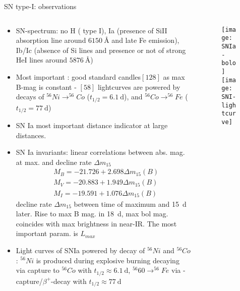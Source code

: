 \begin{frame}{SN type-I: observations} 
\begin{columns}[T]
	\begin{column}{0.5\textwidth}
		\begin{itemize}
			\item SN-spectrum: no H ( type I), Ia (presence of SiII absorption line around $\SI{6150}{\angstrom}$ and late Fe emission), Ib/Ic (absence of Si lines and presence or not of strong HeI lines around $\SI{5876}{\angstrom}$)
			\item Most important : good standard candles$[128]$ as max B-mag is constant - $[58]$ lightcurves are powered by decays of $^{56}Ni\to ^{56}Co$ ($t_{1/2}=\SI{6.1}{\day}$), and $^{56}Co\to^{56}Fe$ ($t_{1/2}=\SI{77}{\day}$) 
            \item SN Ia most important distance indicator at large distances.
            \item SN Ia invariants: linear correlations between abs. mag. at max. and decline rate $\Delta m _{15}$
                \begin{align*}
                    &M_B=-21.726 +2.698\Delta m_{15}(B)\\
                    &M_V=-20.883+1.949\Delta m_{15}(B)\\
                    &M_I=-19.591+1.076\Delta m_{15}(B)
                \end{align*}
                decline rate $\Delta m_{15}$ between time of maximum and \SI{15}{\day} later. Rise to max B mag. in \SI{18}{\day}, max bol mag. coincides with max brightness in near-IR. The most important param. is $L_{max}$
            \item Light curves of SNIa powered by decay of $^{56}Ni$ and $^{56}Co$: $^{56}Ni$ is produced during explosive burning decaying via \Pelectron capture to $^{56}Co$ with $t_{1/2}\approx\SI{6.1}{\day}$, $^{56}60\to^{56}Fe$ via \Pelectron-capture/$\beta^+$-decay with $t_{1/2}\approx\SI{77}{\day}$
        \end{itemize}
	\end{column}
	\begin{column}{0.5\textwidth}
		\begin{figure}[!ht]
		\texttt{[image: SNIa-bolo]}\label{fig:SNIa-bolo}
			\texttt{[image: SNI-lightcurve]}\label{fig:SNI-lightcurve}
		\end{figure}
\end{column}\end{columns}
\end{frame}

